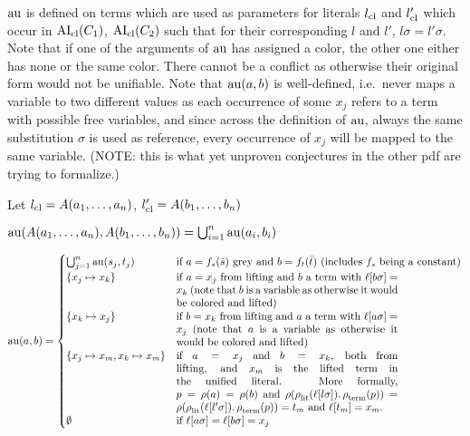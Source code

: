 \documentclass[,%
	paper=a4,%
	DIV12, %
	twoside=false,%
	liststotoc,
	bibtotoc,
	draft=false,%
	numbers=noendperiod
]{scrartcl}
\begin{document}
\begin{enumerate}
		$\operatorname{au}$ is defined on terms which are used as parameters for literals $l_\mathrm{cl}$ and $l_\mathrm{cl}'$
		which occur in $\operatorname{AI}_\mathrm{cl}(C_1)$, $\operatorname{AI}_\mathrm{cl}(C_2)$ such that for their corresponding $l$ and $l'$, $l\sigma = l'\sigma$.
		Note that if one of the arguments of $\operatorname{au}$ has assigned a color, the other one either has none or the same color.
		There cannot be a conflict as otherwise their original form would not be unifiable.
		Note that $\operatorname{au}(a, b)$ is well-defined, i.e.~never maps a variable to two different values as each occurrence of some $x_j$ refers to a term with possible free variables, and since across the definition of $\operatorname{au}$, always the same substitution $\sigma$ is used as reference, every occurrence of $x_j$ will be mapped to the same variable. (NOTE: this is what yet unproven conjectures in the other pdf are trying to formalize.)

		Let 
		$l_\mathrm{cl} = A(a_1, \dotsc, a_n)$, $l_\mathrm{cl}' = A(b_1, \dotsc, b_n)$

		$\operatorname{au}(A(a_1, \dotsc, a_n), A(b_1, \dotsc, b_n)) = \bigcup_{i=1}^n \operatorname{au}(a_i, b_i)$

		$ \aiu (a, b) =
			\begin{cases}
				\bigcup_{j=1}^n \aiu(s_j, t_j) & \text{if $a=f_s(\bar s)$ grey and $b = f_t(\bar t)$ (includes $f_s$ being a constant)} \\
				\{x_j \mapsto x_k\} & \parbox[t]{.6\textwidth}{ if $a = x_j$ from lifting and $b$ a term with $\lifboth{b\sigma} = x_k$ (note that $b$ is a variable as otherwise it would be colored and lifted)} \\
			\{x_k \mapsto x_j\} & \parbox[t]{.6\textwidth}{  if $b = x_k$ from lifting and $a$ a term with $\lifboth{a\sigma} = x_j$ (note that $a$ is a variable as otherwise it would be colored and lifted)} \\
				\{x_j \mapsto x_m, x_k \mapsto x_m\} & \parbox[t]{.6\textwidth}{if $a = x_j$ and $b = x_k$, both from lifting, and $x_m$ is the lifted term in the unified literal. More formally, $p = \pos(a) = \pos(b)$ and $\pos(\poslit(\lifboth{l\sigma}).\posterm(p)) = \pos(\poslit(\lifboth{l'\sigma}).\posterm(p)) = t_m$ and $\lifboth{t_m} = x_m$.}\\
				\emptyset & \text{if $\lifboth{a\sigma} = \lifboth{b\sigma} = x_j$ }
			\end{cases} $


\end{enumerate}
\end{document}
